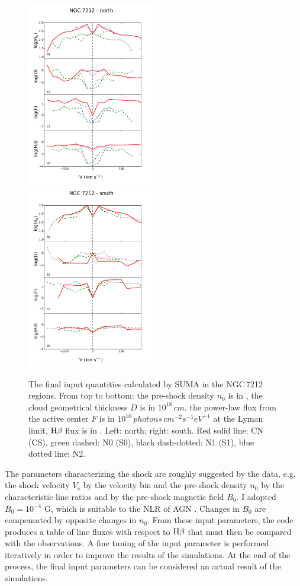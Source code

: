 \documentclass[../main.tex]{subfiles}
\begin{document}
\begin{figure}
\includegraphics[width=0.5\textwidth]{images/paper1/n72n.pdf}
\includegraphics[width=0.5\textwidth]{images/paper1/n72s.pdf}
\caption{The final input quantities calculated by SUMA in the NGC\,7212 regions. From top to bottom: the pre-shock density $n_0$ is in , the cloud geometrical thickness $D$ is in $10^{18}\,\si{cm}$, the power-law flux from the active center $F$ is in $10^{10}\,\si{photons\,cm^{-2} s^{-1} eV^{-1}}$ at the Lyman limit, $\rm H\beta$ flux is in \erg. Left: north; right: south. Red solid line: CN (CS), green dashed: N0 (S0), black dash-dotted: N1 (S1), blue dotted line: N2.}
\label{fig:NGC_m}
\end{figure}


The parameters characterizing the shock are roughly suggested by the data, e.g. the shock velocity $V_s$ by the velocity bin and the pre-shock density $n_0$ by the characteristic line ratios and by the pre-shock magnetic field $B_0$.
I adopted $B_0  = 10^{-4}$ G, which is suitable to the NLR of AGN \citep{Beck12}.
Changes in $B_0$ are compensated by opposite changes in $n_0$.
From these input parameters, the code produces a table of line fluxes with respect to $\rm H\beta$ that must then be compared with the observations.
A fine tuning of the input parameter is performed iteratively in order to improve the results of the simulations.
At the end of the process, the final input parameters can be considered an actual result of the simulations. 
\end{document}
